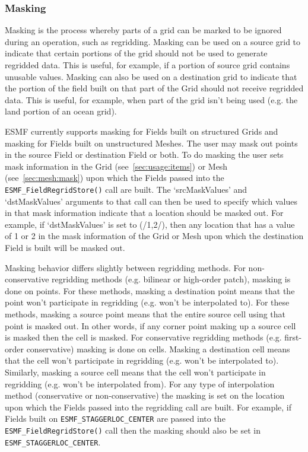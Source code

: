 \subsubsection{Masking}
 Masking is the process whereby parts of a grid can be marked to be ignored during an operation, such as regridding. Masking can be used on a source grid to 
 indicate that certain portions of the grid should not be used to generate regridded data. This is useful, for example, if a portion of source grid contains 
 unusable values. Masking can also be used on a destination grid to indicate that the portion of the field built on that part of the Grid should not receive 
 regridded data. This is useful, for example, when part of the grid isn't being used (e.g. the land portion of an ocean grid).

 ESMF currently supports masking for Fields built on structured Grids and masking for Fields built on unstructured Meshes. The user may mask out points 
 in the source Field or destination Field or both. To do masking the user sets mask information in the Grid (see~\ref{sec:usage:items}) or 
 Mesh (see~\ref{sec:mesh:mask}) upon which the Fields passed into the 
 {\tt ESMF\_FieldRegridStore()} call are built. The `srcMaskValues' and `dstMaskValues' arguments to that call can then be used to specify which values in that mask 
 information indicate that a location should be masked out. For example, if `dstMaskValues' is set to (/1,2/), then any location that has a value of 1 or 2 in 
 the mask information of the Grid or Mesh upon which the destination Field is built will be masked out.

 Masking behavior differs slightly between regridding methods. For non-conservative regridding methods (e.g. bilinear or high-order patch), masking is done on
 points. For these methods, masking a destination point means that the point won't participate in regridding (e.g. won't be interpolated to). For these methods, 
 masking a source point means that the entire source cell using that point is masked out. In other words, if any corner point making up a source cell is masked 
 then the cell is masked. For conservative regridding methods (e.g. first-order conservative) masking is done on cells. Masking a destination cell means that the 
 cell won't participate in regridding (e.g. won't be interpolated to). Similarly, masking a source cell means that the cell won't participate in regridding 
 (e.g. won't be interpolated from). For any type of interpolation method (conservative or non-conservative) the masking is set on the location upon which the 
 Fields passed into the regridding call are built. For example, if Fields built on {\tt ESMF\_STAGGERLOC\_CENTER} are passed into the {\tt ESMF\_FieldRegridStore()} 
 call then the masking should also be set in {\tt ESMF\_STAGGERLOC\_CENTER}.


